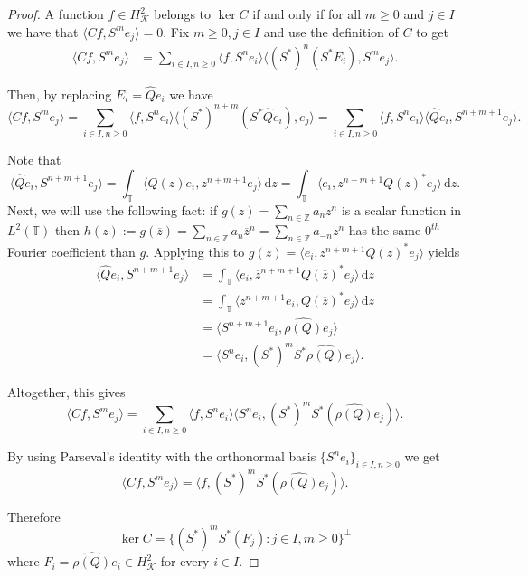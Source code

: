 \documentclass[a4paper,12pt]{amsart}
\def\d{\,{\mathrm{d}}}
\def\KK{{\mathcal{K}}}
\def\T{{\mathbb{T}}}
\def\Z{{\mathbb{Z}}}
\newcommand{\scal}[1]{{\langle{#1}\rangle}}
\theoremstyle{definition}
\begin{document}
\begin{proof}
A function $f\in H^2_\KK$ belongs to $\ker C$ if and only if for all $m\geqslant 0$ and $j\in I$ we have that $\scal{Cf,S^me_j}=0$. Fix $m\geqslant0, j\in I$ and use the definition of $C$ to get
\begin{align*}
\scal{Cf,S^me_j}&=\sum_{i\in I,n\geqslant0}\scal{f,S^ne_i}\scal{(S^*)^n(S^*E_i),S^me_j}.
\end{align*}

Then, by replacing $E_i =\widehat{Q}e_i$ we have
\begin{equation*}
\scal{Cf,S^me_j}=\sum_{i\in I,n\geqslant0}\scal{f,S^ne_i}\scal{(S^*)^{n+m}(S^*\widehat{Q}e_i),e_j} =\sum_{i\in I, n\geqslant0}\scal{f,S^ne_i}\scal{\widehat{Q}e_i, S^{n+m+1} e_j}.
\end{equation*}

Note that
\begin{equation*}
\scal{\widehat{Q}e_i,S^{n+m+1}e_j}=\int_\T\scal{Q(z)e_i,z^{n+m+1}e_j}\d z=\int_\T\scal{e_i, z^{n+m+1}Q(z)^*e_j}\d z.
\end{equation*}
Next, we will use the following fact: if $g(z)=\sum_{n\in\Z}a_nz^n$ is a scalar function in $L^2(\T)$ then $h(z):=g(\overline{z})=\sum_{n\in\Z}a_n\overline{z}^n=\sum_{n\in\Z}a_{-n}z^n$ has the same $0^{th}$-Fourier coefficient than $g$. Applying this to $g(z)=\scal{e_i, z^{n+m+1}Q(z)^*e_j}$ yields
\begin{align*}
\scal{\widehat{Q}e_i,S^{n+m+1}e_j}&=\int_\T\scal{e_i,\overline{z}^{n+m+1}Q(\overline{z})^*e_j}\d z
\\
&=\int_\T\scal{z^{n+m+1}e_i,Q(\overline{z})^*e_j}\d z
\\
&=\scal{S^{n+m+1}e_i,\widehat{\rho(Q)}e_j}
\\
&=\scal{S^ne_i,(S^*)^mS^*\widehat{\rho(Q)}e_j}.
\end{align*}

Altogether, this gives
\begin{equation*}
\scal{Cf,S^me_j}=\sum_{i\in I,n\geqslant0}\scal{f,S^ne_i}\scal{S^ne_i, (S^*)^{m} S^* (\widehat{\rho(Q)} e_j)}.
\end{equation*}

By using Parseval's identity with the orthonormal basis $\{S^n e_i\}_{i\in I,n\geqslant0}$ we get
\begin{equation*}
\scal{Cf,S^me_j} =\scal{f, (S^*)^{m} S^* (\widehat{\rho(Q)} e_j)}.
\end{equation*}

Therefore
\begin{equation*}
\ker C=\{(S^*)^mS^*(F_j):j\in I,m\geqslant0\}^\perp
\end{equation*}
where $F_i=\widehat{\rho(Q)} e_i\in H^2_\KK$ for every $i\in I$. 


\end{proof}
\end{document}
